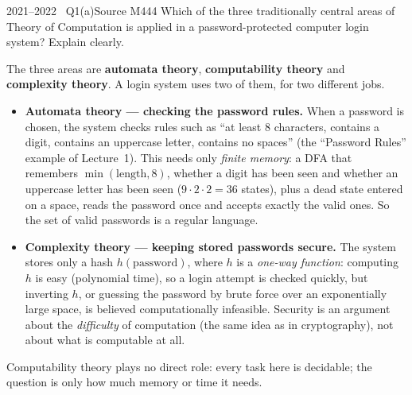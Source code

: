 \documentclass[11pt,a4paper]{article}
\begin{document}
\begin{question}{2021--2022 \textbullet\ Q1(a)}{Source M44}{4}
Which of the three traditionally central areas of Theory of Computation is applied in a password-protected computer login system? Explain clearly.
\end{question}
\begin{solution}
The three areas are \textbf{automata theory}, \textbf{computability theory} and \textbf{complexity theory}. A login system uses two of them, for two different jobs.
\begin{itemize}
\item \textbf{Automata theory --- checking the password rules.} When a password is chosen, the system checks rules such as ``at least 8 characters, contains a digit, contains an uppercase letter, contains no spaces'' (the ``Password Rules'' example of Lecture~1). This needs only \emph{finite memory}: a DFA that remembers $\min(\text{length},8)$, whether a digit has been seen and whether an uppercase letter has been seen ($9\cdot2\cdot2=36$ states), plus a dead state entered on a space, reads the password once and accepts exactly the valid ones. So the set of valid passwords is a regular language.
\item \textbf{Complexity theory --- keeping stored passwords secure.} The system stores only a hash $h(\text{password})$, where $h$ is a \emph{one-way function}: computing $h$ is easy (polynomial time), so a login attempt is checked quickly, but inverting $h$, or guessing the password by brute force over an exponentially large space, is believed computationally infeasible. Security is an argument about the \emph{difficulty} of computation (the same idea as in cryptography), not about what is computable at all.
\end{itemize}
Computability theory plays no direct role: every task here is decidable; the question is only how much memory or time it needs.
\end{solution}
\end{document}
